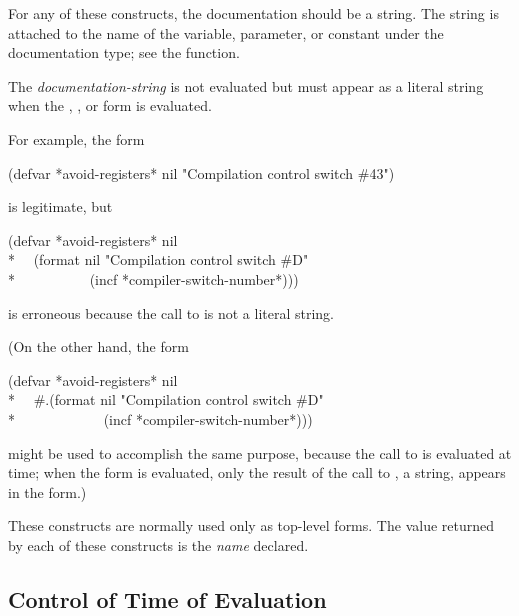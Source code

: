 \begin{defmac}
For any of these constructs,
the documentation should be a string.  The string is attached
to the name of the variable, parameter, or constant
under the  documentation type; see the 
function.

The \emph{documentation-string}
is not evaluated but must appear as a literal string when the ,
, or  form is evaluated.

For example,
the form
\begin{lisp}
(defvar *avoid-registers* nil "Compilation control switch \#43")
\end{lisp}
is legitimate, but
\begin{lisp}
(defvar *avoid-registers* nil \\*
~~(format nil "Compilation control switch \#{\Xtilde}D" \\*
~~~~~~~~~~(incf *compiler-switch-number*)))
\end{lisp}
is erroneous because the call to  is not a literal string.

(On the other hand, the form
\begin{lisp}
(defvar *avoid-registers* nil \\*
~~\#.(format nil "Compilation control switch \#{\Xtilde}D" \\*
~~~~~~~~~~~~(incf *compiler-switch-number*)))
\end{lisp}
might be used to accomplish the same purpose, because the call to
 is evaluated at  time; when the  form
is evaluated, only the result of the call to , a string,
appears in the  form.)

These constructs are normally used only as top-level forms.  The
value returned by each of these constructs is the \emph{name} declared.
\end{defmac}

\subsection{Control of Time of Evaluation}

